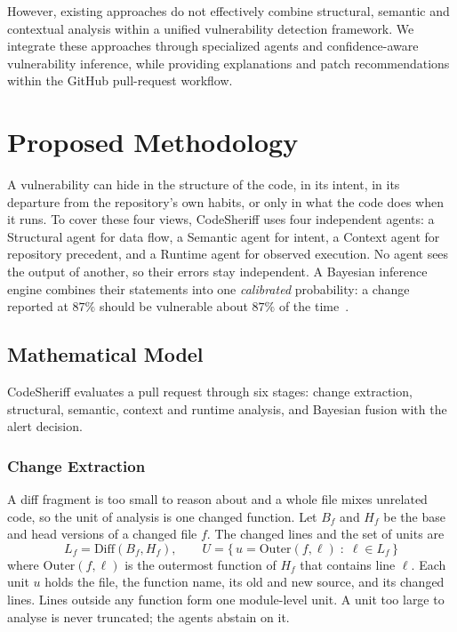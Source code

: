 \documentclass[conference]{IEEEtran}
\begin{document}
However, existing approaches do not effectively combine structural, semantic and contextual analysis within a unified vulnerability detection framework. We integrate these approaches through specialized agents and confidence-aware vulnerability inference, while providing explanations and patch recommendations within the GitHub pull-request workflow.

\section{Proposed Methodology} \label{PS}

A vulnerability can hide in the structure of the code, in its intent, in
its departure from the repository's own habits, or only in what the code
does when it runs. To cover these four views, CodeSheriff uses four
independent agents: a Structural agent for data flow, a Semantic agent for
intent, a Context agent for repository precedent, and a Runtime agent for
observed execution. No agent sees the output of another, so their errors
stay independent. A Bayesian inference engine combines their statements
into one \emph{calibrated} probability: a change reported at $87\%$ should
be vulnerable about $87\%$ of the time~\cite{guo2017calibration}.

\subsection{Mathematical Model}

CodeSheriff evaluates a pull request through six stages: change
extraction, structural, semantic, context and runtime analysis, and
Bayesian fusion with the alert decision.

\subsubsection{Change Extraction}
A diff fragment is too small to reason about and a whole file mixes
unrelated code, so the unit of analysis is one changed function. Let
$B_f$ and $H_f$ be the base and head versions of a changed file $f$. The
changed lines and the set of units are
\begin{equation}
L_f=\mathrm{Diff}(B_f,H_f),\qquad
U=\{\,u=\mathrm{Outer}(f,\ell)\;:\;\ell\in L_f\,\}
\label{eq:units}
\end{equation}
where $\mathrm{Outer}(f,\ell)$ is the outermost function of $H_f$ that
contains line $\ell$. Each unit $u$ holds the file, the function name, its
old and new source, and its changed lines. Lines outside any function form
one module-level unit. A unit too large to analyse is never truncated; the
agents abstain on it.
\end{document}
